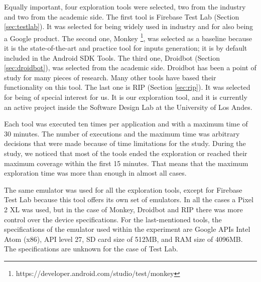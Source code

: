 Equally important, four exploration tools were selected, two from the industry and two from the academic side. The first tool is Firebase Test Lab (Section \ref{sec:testlab}). It was selected for being widely used in industry and for also being a Google product. The second one, Monkey \footnote{https://developer.android.com/studio/test/monkey}, was selected as a baseline because it is the state-of-the-art and practice tool for inputs generation; it is by default included in the Android SDK Tools. The third one, Droidbot (Section \ref{sec:droidbot}), was selected from the academic side. Droidbot has been a point of study for many pieces of research. Many other tools have based their functionality on this tool. The last one is RIP (Section \ref{sec:rip}). It was selected for being of special interest for us. It is our exploration tool, and it is currently an active project inside the Software Design Lab at the University of Los Andes. 

Each tool was executed ten times per application and with a maximum time of 30 minutes. The number of executions and the maximum time was arbitrary decisions that were made because of time limitations for the study. During the study, we noticed that most of the tools ended the exploration or reached their maximum coverage within the first 15 minutes. That means that the maximum exploration time was more than enough in almost all cases. 

The same emulator was used for all the exploration tools, except for Firebase Test Lab because this tool offers its own set of emulators. In all the cases a Pixel 2 XL was used, but in the case of Monkey, Droidbot and RIP there was more control over the device specifications. For the last-mentioned tools, the specifications of the emulator used within the experiment are Google APIs Intel Atom (x86), API level 27, SD card size of 512MB, and RAM size of 4096MB. The specifications are unknown for the case of Test Lab.

